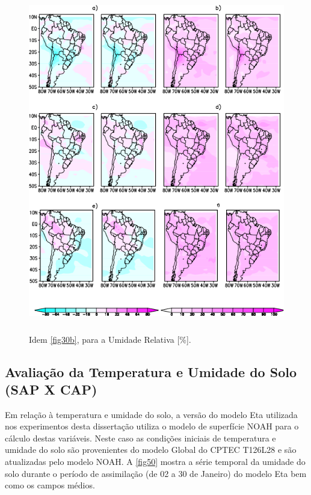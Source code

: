 \begin{figure}[!hbp]
\centering
\includegraphics[height=15cm]{./figs/campo_vies_eqm-umrl.png}
\caption{Idem \autoref{fig30b}, para a Umidade Relativa [\%].}
\label{fig34b}
\end{figure}







\subsection{Avaliação da Temperatura e Umidade do Solo (SAP X CAP)}
\label{ss:avaltempumi}

Em relação à temperatura e umidade do solo, a versão do modelo Eta utilizada nos experimentos desta dissertação utiliza o modelo de superfície NOAH para o cálculo destas variáveis. Neste caso as condições iniciais de temperatura e umidade do solo são provenientes do modelo Global do CPTEC T126L28 e são atualizadas pelo modelo NOAH. A \autoref{fig50} mostra a série temporal da umidade do solo durante o período de assimilação (de 02 a 30 de Janeiro) do modelo Eta bem como os campos médios.



